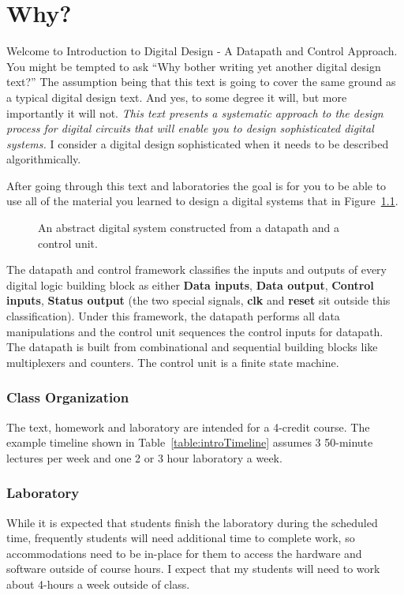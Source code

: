 \chapter{Why?}
\label{chapter:Introduction}
\graphicspath{ {./chapter00/Fig} }


Welcome to Introduction to Digital Design - A Datapath and Control Approach.  
You might be tempted to ask ``Why bother writing yet another digital design 
text?''  The assumption being that this text is going to cover the same ground as a 
typical digital design text.  And yes, to some  degree it will, but more importantly 
it will not.   \emph{This text presents a systematic approach to the design process for 
digital circuits that will enable you to design sophisticated digital systems.} I consider a
digital design sophisticated when it needs to be described algorithmically.

After going through this text and laboratories the goal is for you to be able to
use all of the material you learned to design a digital systems that in 
Figure~\ref{fig:introAbstract}.

\begin{figure}[ht]
\caption{An abstract digital system constructed from a datapath and a control unit.}
\label{fig:introAbstract}
\end{figure}

The datapath and control framework classifies the inputs and outputs of every
digital logic building block as either \textbf{Data inputs}, \textbf{Data output}, \textbf{Control inputs}, 
\textbf{Status output} (the two special signals, \textbf{clk} and \textbf{reset} sit outside this
classification).  Under this framework, the datapath performs all data manipulations and the 
control unit sequences the control inputs for datapath.  The datapath is built from
combinational and sequential building blocks like multiplexers and counters.  The control unit
is a finite state machine.

\subsection{Class Organization}
The text, homework and laboratory are intended for a 4-credit course.  The example timeline 
shown in Table~\ref{table:introTimeline} assumes 3 50-minute lectures per week and 
one 2 or 3 hour laboratory a week. 

\subsection{Laboratory}
While it is expected that students finish the laboratory
during the scheduled time, frequently students will need additional time to complete work, so accommodations need
to be in-place for them to access the hardware and software outside of course hours.   I expect that my students will 
need to work about 4-hours a week outside of class. 


